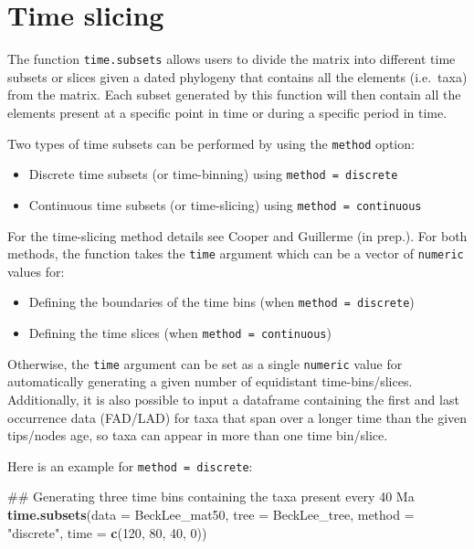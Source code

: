 \documentclass[]{book}
\newenvironment{Shaded}{\begin{snugshade}}{\end{snugshade}}
\newcommand{\KeywordTok}[1]{\textcolor[rgb]{0.13,0.29,0.53}{\textbf{#1}}}
\newcommand{\DataTypeTok}[1]{\textcolor[rgb]{0.13,0.29,0.53}{#1}}
\newcommand{\DecValTok}[1]{\textcolor[rgb]{0.00,0.00,0.81}{#1}}
\newcommand{\StringTok}[1]{\textcolor[rgb]{0.31,0.60,0.02}{#1}}
\newcommand{\NormalTok}[1]{#1}
\providecommand{\tightlist}{%
  \setlength{\itemsep}{0pt}\setlength{\parskip}{0pt}}
\theoremstyle{definition}
\theoremstyle{definition}
\theoremstyle{remark}
\begin{document}
\hypertarget{time-slicing}{\section{Time slicing}\label{time-slicing}}

The function \texttt{time.subsets} allows users to divide the matrix
into different time subsets or slices given a dated phylogeny that
contains all the elements (i.e.~taxa) from the matrix. Each subset
generated by this function will then contain all the elements present at
a specific point in time or during a specific period in time.

Two types of time subsets can be performed by using the \texttt{method}
option:

\begin{itemize}
\tightlist
\item
  Discrete time subsets (or time-binning) using
  \texttt{method\ =\ discrete}
\item
  Continuous time subsets (or time-slicing) using
  \texttt{method\ =\ continuous}
\end{itemize}

For the time-slicing method details see Cooper and Guillerme (in prep.).
For both methods, the function takes the \texttt{time} argument which
can be a vector of \texttt{numeric} values for:

\begin{itemize}
\tightlist
\item
  Defining the boundaries of the time bins (when
  \texttt{method\ =\ discrete})
\item
  Defining the time slices (when \texttt{method\ =\ continuous})
\end{itemize}

Otherwise, the \texttt{time} argument can be set as a single
\texttt{numeric} value for automatically generating a given number of
equidistant time-bins/slices. Additionally, it is also possible to input
a dataframe containing the first and last occurrence data (FAD/LAD) for
taxa that span over a longer time than the given tips/nodes age, so taxa
can appear in more than one time bin/slice.

Here is an example for \texttt{method\ =\ discrete}:

\begin{Shaded}
\begin{Highlighting}[]
\NormalTok{## Generating three time bins containing the taxa present every 40 Ma}
\KeywordTok{time.subsets}\NormalTok{(}\DataTypeTok{data =}\NormalTok{ BeckLee_mat50, }\DataTypeTok{tree =}\NormalTok{ BeckLee_tree, }\DataTypeTok{method =} \StringTok{"discrete"}\NormalTok{,}
                \DataTypeTok{time =} \KeywordTok{c}\NormalTok{(}\DecValTok{120}\NormalTok{, }\DecValTok{80}\NormalTok{, }\DecValTok{40}\NormalTok{, }\DecValTok{0}\NormalTok{))}
\end{Highlighting}
\end{Shaded}
\end{document}
